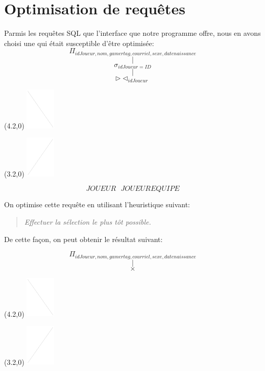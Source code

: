 \documentclass[11pt,french]{article}
\begin{document}
    \section{Optimisation de requêtes} %
    \label{sec:optimisation-requetes}
        Parmis les requêtes SQL que l'interface que notre programme offre, nous en avons choisi une qui était susceptible d'être optimisée:
        $$\Pi_{idJoueur,nom,gamertag,courriel,sexe,datenaissance}$$
        $$\Bigg |$$
        $$\sigma_{idJoueur=ID}$$
        $$\Bigg |$$
        $$\rhd \lhd_{idJoueur}$$
        \begin{textblock}{0.2}(4.2,0)
            \includegraphics[height=2cm]{aux/ligneDiag.png}
        \end{textblock}
        \begin{textblock}{0.2}(3.2,0)
            \includegraphics[height=2cm]{aux/ligneDiag2.png}
        \end{textblock}

        \vspace{1.8cm}

        $$JOUEUR \ \ \ JOUEUREQUIPE$$

        \vspace{1.5cm}
        
        On optimise cette requête en utilisant l'heuristique suivant:
        \begin{quotation}
            \og \emph{Effectuer la sélection le plus tôt possible.} \fg
        \end{quotation}
        
        \newpage
        De cette façon, on peut obtenir le résultat suivant:
       
        $$\Pi_{idJoueur,nom,gamertag,courriel,sexe,datenaissance}$$
        $$\Bigg |$$
        $${} \times {}$$
        \begin{textblock}{0.2}(4.2,0)
            \includegraphics[height=2cm]{aux/ligneDiag.png}
        \end{textblock}
        \begin{textblock}{0.2}(3.2,0)
            \includegraphics[height=2cm]{aux/ligneDiag2.png}
        \end{textblock}
\end{document}
